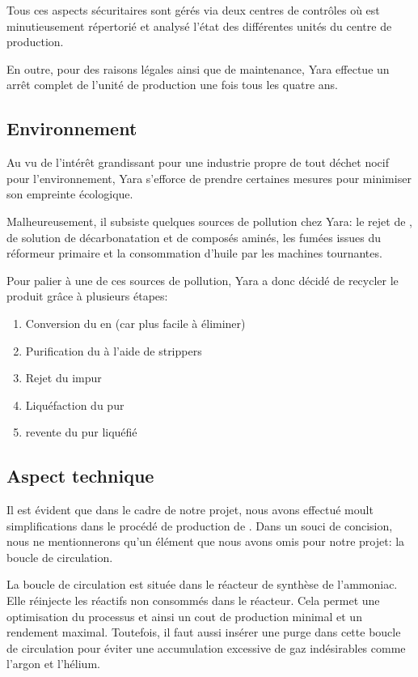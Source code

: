 		Tous ces aspects sécuritaires sont gérés via deux centres de contrôles où est minutieusement répertorié et analysé l'état des différentes unités du centre de production.
		
		En outre, pour des raisons légales ainsi que de maintenance, Yara effectue un arrêt complet de l'unité de production une fois tous les quatre ans.
		
\subsection{Environnement}
	Au vu de l'intérêt grandissant pour une industrie propre de tout déchet nocif pour l'environnement, Yara  s'efforce de prendre certaines mesures pour minimiser son empreinte écologique. 
	
	Malheureusement, il subsiste quelques sources de pollution chez Yara: le rejet de , de solution de décarbonatation et de composés aminés, les fumées issues du réformeur primaire et la consommation d'huile par les machines tournantes.
	
	Pour palier à une de ces sources de pollution, Yara a donc décidé de recycler le  produit grâce à plusieurs étapes:
		\begin{enumerate}
		\item Conversion du  en  (car plus facile à éliminer)
		\item Purification du  à l'aide de strippers
		\item Rejet du  impur
		\item Liquéfaction du  pur
		\item revente du  pur liquéfié
		\end{enumerate}
		
\subsection{Aspect technique}
	Il est évident que dans le cadre de notre projet, nous avons effectué moult simplifications dans le procédé de production de . Dans un souci de concision, nous ne mentionnerons qu'un élément que nous avons omis pour notre projet: la boucle de circulation.
	
	La boucle de circulation est située dans le réacteur de synthèse de l'ammoniac. Elle réinjecte les réactifs non consommés dans le réacteur. Cela permet une optimisation du processus et ainsi un cout de production minimal et un rendement maximal. Toutefois, il faut aussi insérer une purge dans cette boucle de circulation pour éviter une accumulation excessive de gaz indésirables comme l'argon et l'hélium.
		
